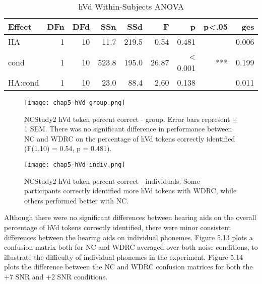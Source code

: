 \begin{table}[htp]
\begin{center}
\begin{tabular}{lrrrrrrrr}
       Effect & DFn & DFd  &  SSn &  SSd  &    F  &     p & p<.05  &   ges \\
       \hline
          HA &  1 & 10  &   11.7 & 219.5 &   0.54 & 0.481  &     & 0.006 \\
        cond &  1 & 10  &  523.8 & 195.0 &  26.87 & < 0.001  &   *** & 0.199 \\
     HA:cond &  1 & 10  &   23.0 &  88.4 &   2.60 & 0.138  &     & 0.011 \\
     \hline
\end{tabular}
\end{center}
\caption{hVd Within-Subjects ANOVA}
\end{table}

\begin{figure}[htp]
\begin{center}
\texttt{[image: chap5-hVd-group.png]} \\
\caption[NCStudy2 hVd token percent correct - group]{NCStudy2 hVd token percent correct - group.  Error bars represent $\pm$ 1 SEM.  There was no significant difference in performance between NC and WDRC on the percentage of hVd tokens correctly identified (F(1,10) = 0.54, p = 0.481).}
\label{ch5-hVd-group}
\end{center}
\end{figure}

\begin{figure}[htp]
\begin{center}
\texttt{[image: chap5-hVd-indiv.png]} \\
\caption[NCStudy2 hVd token percent correct - individuals]{NCStudy2 hVd token percent correct - individuals.  Some participants correctly identified more hVd tokens with WDRC, while others performed better with NC.}
\label{ch5-hVd-indiv}
\end{center}
\end{figure}

Although there were no significant differences between hearing aids on the overall percentage of hVd tokens correctly identified, there were minor consistent differences between the hearing aids on individual phonemes.  Figure 5.13 plots a confusion matrix both for NC and WDRC averaged over both noise conditions, to illustrate the difficulty of individual phonemes in the experiment.  Figure 5.14 plots the difference between the NC and WDRC confusion matrices for both the +7 SNR and +2 SNR conditions.

